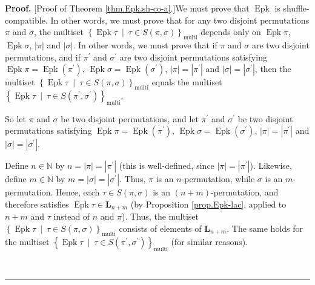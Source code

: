 \documentclass[numbers=enddot,12pt,final,onecolumn,notitlepage]{scrartcl}%
\theoremstyle{definition}
\newenvironment{proof}[1][Proof]{\noindent\textbf{#1.} }{\ \rule{0.5em}{0.5em}}
\begin{document}
\begin{proof}
[Proof of Theorem \ref{thm.Epk.sh-co-a}.]We must prove that
$\operatorname{Epk}$ is shuffle-compatible. In other words, we must prove
that for any two disjoint permutations $\pi$ and $\sigma$, the multiset
$\left\{  \operatorname{Epk} \tau   \ \mid\ \tau\in S\left(
\pi,\sigma\right)  \right\}  _{\operatorname*{multi}}$ depends only on
$\operatorname{Epk} \pi$, $\operatorname{Epk} \sigma$,
$\left\vert \pi\right\vert $ and $\left\vert \sigma \right\vert $.
In other words, we must prove that if $\pi$ and $\sigma$ are
two disjoint permutations, and if $\pi^{\prime}$ and $\sigma^{\prime}$ are two
disjoint permutations satisfying $\operatorname{Epk} \pi 
=\operatorname{Epk}\left(  \pi^{\prime}\right)  $,
$\operatorname{Epk} \sigma
=\operatorname{Epk}\left(  \sigma^{\prime}\right)  $,
$\left\vert \pi\right\vert =\left\vert \pi^{\prime}\right\vert $ and
$\left\vert \sigma\right\vert =\left\vert \sigma^{\prime}\right\vert $, then
the multiset $\left\{  \operatorname{Epk} \tau   \ \mid\ \tau\in
S\left(  \pi,\sigma\right)  \right\}  _{\operatorname*{multi}}$ equals the
multiset $\left\{  \operatorname{Epk} \tau   \ \mid\ \tau\in
S\left(  \pi^{\prime},\sigma^{\prime}\right)  \right\}
_{\operatorname*{multi}}$.

So let $\pi$ and $\sigma$ be two disjoint permutations, and let $\pi^{\prime}$
and $\sigma^{\prime}$ be two disjoint permutations satisfying
$\operatorname{Epk} \pi   =\operatorname{Epk}\left(
\pi^{\prime}\right)  $, $\operatorname{Epk} \sigma 
=\operatorname{Epk}\left(  \sigma^{\prime}\right)  $, $\left\vert
\pi\right\vert =\left\vert \pi^{\prime}\right\vert $ and $\left\vert
\sigma\right\vert =\left\vert \sigma^{\prime}\right\vert $.

Define $n\in\mathbb{N}$ by $n=\left\vert \pi\right\vert =\left\vert
\pi^{\prime}\right\vert $ (this is well-defined, since $\left\vert
\pi\right\vert =\left\vert \pi^{\prime}\right\vert $). Likewise, define
$m\in\mathbb{N}$ by $m=\left\vert \sigma\right\vert =\left\vert \sigma
^{\prime}\right\vert $. Thus, $\pi$ is an $n$-permutation, while $\sigma$ is
an $m$-permutation. Hence, each $\tau\in S\left(  \pi,\sigma\right)  $ is an
$\left(  n+m\right)  $-permutation, and therefore satisfies
$\operatorname{Epk}\tau\in\mathbf{L}_{n+m}$ (by Proposition
\ref{prop.Epk-lac}, applied to $n+m$ and $\tau$ instead of $n$ and $\pi$).
Thus, the multiset $\left\{  \operatorname{Epk} \tau 
\ \mid\ \tau\in S\left(  \pi,\sigma\right)  \right\}  _{\operatorname*{multi}%
}$ consists of elements of $\mathbf{L}_{n+m}$. The same holds for the multiset
$\left\{  \operatorname{Epk} \tau   \ \mid\ \tau\in S\left(
\pi^{\prime},\sigma^{\prime}\right)  \right\}  _{\operatorname*{multi}}$ (for
similar reasons).


\end{proof}
\end{document}
